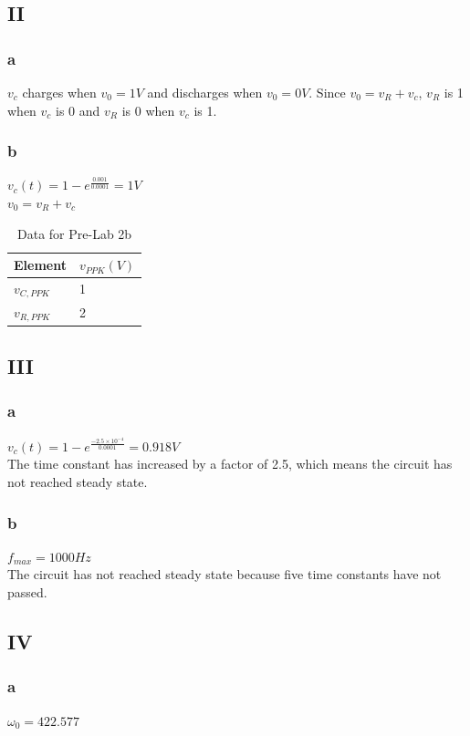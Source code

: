 \documentclass[10pt]{article}
\begin{document}
\subsection*{II}
\subsubsection*{a}
\noindent $v_c$ charges when $v_0 = 1V$ and discharges when $v_0 = 0V$. Since $v_0 = v_R + v_c$, $v_R$ is 1 when $v_c$ is 0 and $v_R$ is 0 when $v_c$ is 1.

\subsubsection*{b}
$v_c(t) = 1-e^{\frac{0.001}{0.0001}} = 1V$\\
$v_0 = v_R + v_c$
\begin{table}[H]
	\centering
	\begin{tabular}{ll}
		\hline
		Element & $v_{PPK} (V)$\\
		\hline
		$v_{C,PPK}$ & 1\\
		$v_{R,PPK}$ & 2\\
		\hline
	\end{tabular}
	\caption{Data for Pre-Lab 2b}
\end{table}

\subsection*{III}
\subsubsection*{a}
$v_c(t) = 1-e^{\frac{-2.5\times10^{-4}}{0.0001}} = 0.918V$\\
\noindent The time constant has increased by a factor of 2.5, which means the circuit has not reached steady state.

\subsubsection*{b}
$f_{max} = 1000Hz$\\
\noindent The circuit has not reached steady state because five time constants have not passed.

\subsection*{IV}
\subsubsection*{a}
$\omega_0 = 422.577$\\
\end{document}
